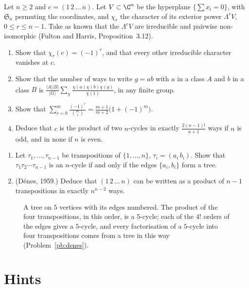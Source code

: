 \begin{exercise}[$\star\star\star$]\label{pb:ncycles}
Let $n\ge2$ and $c=(1\,2\,\dots\,n)$. Let $V\subset\C^n$ be the hyperplane $\{\sum x_i=0\}$, with $\mathfrak S_n$ permuting
the coordinates, and $\chi_r$ the character of its exterior power $\Lambda^rV$, $0\le r\le n-1$. Take as known that the
$\Lambda^rV$ are irreducible and pairwise non-isomorphic (Fulton and Harris, Proposition~3.12).
\begin{enumerate}[label=(\alph*)]
\item Show that $\chi_r(c)=(-1)^r$, and that every other irreducible character vanishes at $c$.
\item Show that the number of ways to write $g=ab$ with $a$ in a class $A$ and $b$ in a class $B$ is
$\frac{|A||B|}{|G|}\sum_\chi\frac{\chi(a)\chi(b)\overline{\chi(g)}}{\chi(1)}$, in any finite group.
\item Show that $\sum_{r=0}^m\frac{(-1)^r}{\binom mr}=\frac{m+1}{m+2}\bigl(1+(-1)^m\bigr)$.
\item Deduce that $c$ is the product of two $n$-cycles in exactly $\frac{2(n-1)!}{n+1}$ ways if $n$ is odd, and in none if $n$ is
even.
\end{enumerate}
\end{exercise}

\begin{exercise}[$\star\star$]\label{pb:denes}
\begin{enumerate}[label=(\alph*)]
\item Let $\tau_1,\dots,\tau_{n-1}$ be transpositions of $\{1,\dots,n\}$, $\tau_i=(a_i\,b_i)$. Show that $\tau_1\tau_2\cdots\tau_{n-1}$ is an
$n$-cycle if and only if the edges $\{a_i,b_i\}$ form a tree.
\item (Dénes, 1959.) Deduce that $(1\,2\,\dots\,n)$ can be written as a product of $n-1$ transpositions in exactly $n^{n-2}$
ways.
\end{enumerate}
\end{exercise}

\begin{figure}[ht]
\centering
{}
\caption{A tree on $5$ vertices with its edges numbered. The product of the four transpositions, in this order, is a $5$-cycle;
each of the $4!$ orders of the edges gives a $5$-cycle, and every factorisation of a $5$-cycle into four transpositions comes
from a tree in this way (Problem~\ref{pb:denes}).}
\label{fig:tree}
\end{figure}

\section{Hints}


